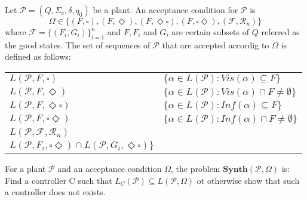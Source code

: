 \documentclass[table]{beamer}
\newcommand{\Plant}{\ensuremath{\mathcal{P}=(Q,\Sigma_c,\delta, q_0)}}
\newcommand{\AccpCond}{\ensuremath{\{(F,\square),(F,\Diamond ),(F,\Diamond\square),(F,\square\Diamond),(\mathcal{F},\mathcal{R}_n)\}}}
\newcommand{\Synth}{\ensuremath{\textbf{Synth}(\mathcal{P},\Omega)}}
\begin{document}
\begin{frame}
	\begin{dfn}
		Let $\Plant$ be a plant. An acceptance condition for $\mathcal{P}$ is
		$$ \Omega \in \AccpCond$$
		where $\mathcal{F} = \{(F_i,G_i)\}^{n}_{i=1}$ and $F, F_i$ and $G_i$ 
		are certain subsets of $Q$ referred as the good states. The set of sequences of $\mathcal{P}$ that are accepted
		accordig to $\Omega$ is defined as follows:
	\end{dfn}
	\begin{adjustwidth}{-1cm}{-1cm}
	\begin{table}[]
		\begin{tabular}{ll}
		\hline
		\rowcolor{azzurro_chiaro}
		$L(\mathcal{P},F,\square)$ & $\{\alpha \in L(\mathcal{P}):Vis(\alpha)\subseteq F\}$ \\ 
		$L(\mathcal{P},F,\Diamond)$ & $\{\alpha \in L(\mathcal{P}):Vis(\alpha)\cap F \neq \emptyset\}$ \\ 
		\rowcolor{azzurro_chiaro}
		$L(\mathcal{P},F,\Diamond\square)$ & $\{\alpha \in L(\mathcal{P}):Inf(\alpha)\subseteq F\}$ \\ 
		$L(\mathcal{P},F,\square\Diamond)$ & $\{\alpha \in L(\mathcal{P}):Inf(\alpha)\cap F \neq \emptyset\}$\\ 
		\rowcolor{azzurro_chiaro}
		$L(\mathcal{P},\mathcal{F},\mathcal{R}_n)$ & \shortstack{
			$\{\alpha \in L(\mathcal{P}): \exists i \alpha \in$ \\
			$L(\mathcal{P},F_i,\square\Diamond) \cap L(\mathcal{P},G_i,\Diamond\square)\}$
		} \\ 
		\hline
		\end{tabular}
	\end{table}
	\end{adjustwidth}
\end{frame}

\begin{frame}
	\begin{dfn}
		For a plant $\mathcal{P}$ and an acceptance condition $\Omega$, the problem $\Synth$ is:
		Find a controller C such that $L_C(\mathcal{P})\subseteq L(\mathcal{P},\Omega)$ ot otherwise show that such
		 a controller does not exists.
	\end{dfn}
\end{frame}
\end{document}
